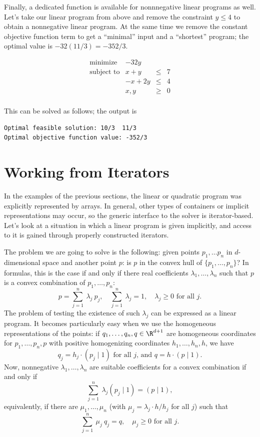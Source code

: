 Finally, a dedicated function is available for nonnnegative linear
programs as well. Let's take our linear program from above and remove
the constraint $y\leq 4$ to obtain a nonnegative linear program. At
the same time we remove the constant objective function term to get
a ``minimal'' input and a ``shortest'' program; the optimal value is
$-32(11/3)=-352/3$.

\[
\begin{array}{lrcl}
\mbox{minimize}       & - 32y \\
\mbox{subject to}     & x + y &\leq& 7 \\
                      & -x + 2y &\leq& 4 \\
                      & x,y &\geq& 0 \\
\end{array}
\] 

This can be solved as follows; the output is
\begin{verbatim}
Optimal feasible solution: 10/3  11/3
Optimal objective function value: -352/3
\end{verbatim}


\section{Working from Iterators}\label{sec:QP-working_from_iterators}
In the examples of the previous sections, the linear or quadratic
program was explicitly represented by arrays. In general, other types
of containers or implicit representations may occur, so the
generic interface to the solver is iterator-based. Let's look at a
situation in which a linear program is given implicitly, and
access to it is gained through properly constructed iterators.

The problem we are going to solve is the following: given points
$p_1,\ldots p_{n}$ in $d$-dimensional space and another point $p$: is
$p$ in the convex hull of $\{p_1,\ldots,p_{n}\}$? In formulas, this is
the case if and only if there real coefficients
$\lambda_1,\ldots,\lambda_n$ such that $p$ is a convex combination of
$p_1,\ldots,p_n$: 
\[
p = \sum_{j=1}^{n}~\lambda_j~p_j, \quad \sum_{j=1}^{n}~\lambda_j = 1,
\quad \lambda_j \geq 0 \mbox{~for all $j$.}
\]
The problem of testing the existence of such $\lambda_j$ can 
be expressed as a linear program. It becomes particularly easy
when we use the homogeneous representations of the points: if
$q_1,\ldots,q_n,q\in\R^{d+1}$ are homogeneous coordinates for
$p_1,\ldots,p_n,p$ with positive homogenizing coordinates 
$h_1,\ldots,h_n,h$, we have
\[q_j = h_j \cdot (p_j \mid 1) \mbox{~for all $j$, and~} q = h \cdot
(p\mid 1).\] Now, nonnegative $\lambda_1,\ldots,\lambda_n$ are
suitable coefficients for a convex combination if and only if
\[\sum_{j=1}^n~ \lambda_j(p_j \mid 1) = (p\mid 1), \]
equivalently, if there are $\mu_1,\ldots,\mu_n$ 
(with $\mu_j = \lambda_j \cdot h/{h_j}$ for all $j$) such that
\[
\sum_{j=1}^n~\mu_j~q_j = q, \quad \mu_j \geq 0\mbox{~for all $j$}.
\]

